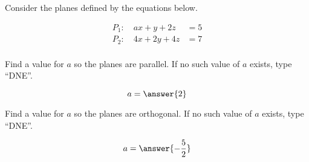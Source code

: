 \documentclass{ximera}
\author{Jim Talamo}
\begin{document}
\begin{exercise}

Consider the planes defined by the equations below.

\[
\begin{array}{lr}
P_1:  \quad ax+y+2z &=5 \\
P_2:  \quad  4x+2y+4z &= 7 \\
\end{array}
\]

Find a value for $a$ so the planes are parallel.  If no such value of $a$ exists, type ``DNE''.

\[
a = \answer{2}
\]

Find a value for $a$ so the planes are orthogonal.  If no such value of $a$ exists, type ``DNE''.

\[
a = \answer{-\frac{5}{2}}
\]

\end{exercise}
\end{document}
